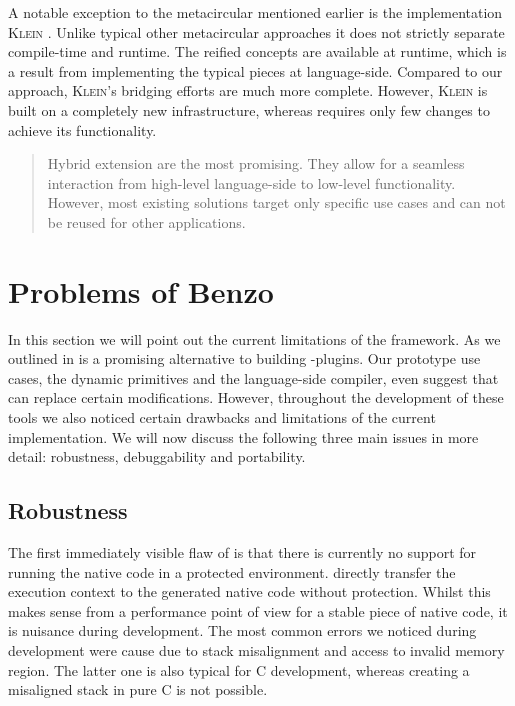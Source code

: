 A notable exception to the metacircular \VMs mentioned earlier is the \Self implementation \textsc{Klein} \cite{Unga05a}.
Unlike typical other metacircular approaches it does not strictly separate compile-time and runtime.
The reified \VM concepts are available at runtime, which is a result from implementing the typical \VM pieces at language-side.
Compared to our approach, \textsc{Klein}'s bridging efforts are much more complete.
However, \textsc{Klein} is built on a completely new \VM infrastructure, whereas \B requires only few changes to achieve its functionality.

\begin{quote}
Hybrid extension are the most promising.
They allow for a seamless interaction from high-level language-side to low-level functionality.
However, most existing solutions target only specific use cases and can not be reused for other applications.
\end{quote}


\section{Problems of Benzo}
In this section we will point out the current limitations of the \B framework.
As we outlined in  \B is a promising alternative to building \VM-plugins.
Our prototype use cases, the dynamic primitives and the language-side \JIT compiler, even suggest that \B can replace certain \VM modifications.
However, throughout the development of these tools we also noticed certain drawbacks and limitations of the current \B implementation.
We will now discuss the following three main issues in more detail: robustness, debuggability and portability.

\subsection{Robustness}

The first immediately visible flaw of \B is that there is currently no support for running the native code in a protected environment.
\B directly transfer the execution context to the generated native code without protection.
Whilst this makes sense from a performance point of view for a stable piece of native code, it is nuisance during development.
The most common errors we noticed during development were cause due to stack misalignment and access to invalid memory region.
The latter one is also typical for C development, whereas creating a misaligned stack in pure C is not possible.

